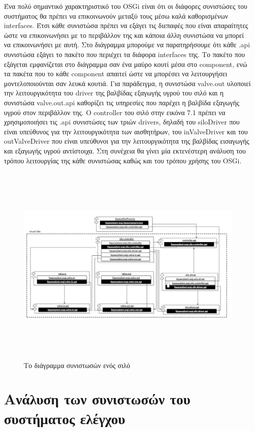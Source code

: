 	Ένα πολύ σημαντικό χαρακτηριστικό του OSGi είναι ότι οι διάφορες συνιστώσες του συστήματος θα πρέπει να επικοινωνούν μεταξύ τους μέσω καλά καθορισμένων interfaces. Έτσι κάθε συνιστώσα πρέπει να εξάγει τις διεπαφές που είναι απαραίτητες ώστε να επικοινωνήσει με το περιβάλλον της και κάποια άλλη συνιστώσα να μπορεί να επικοινωνήσει με αυτή. Στο διάγραμμα μπορούμε να παρατηρήσουμε ότι κάθε .api συνιστώσα εξάγει το πακέτο που περιέχει τα διάφορα interfaces της. Το πακέτο που εξάγεται εμφανίζεται στο διάγραμμα σαν ένα μαύρο κουτί μέσα στο component, ενώ τα πακέτα που το  κάθε component απαιτεί ώστε να μπορέσει να λειτουργήσει μοντελοποιούνται σαν λευκά κουτιά. Για παράδειγμα, η συνιστώσα valve.out υλοποιεί την λειτουργικότητα του driver της βαλβίδας εξαγωγής υγρού του σιλό και η συνιστώσα valve.out.api καθορίζει τις υπηρεσίες που παρέχει η βαλβίδα εξαγωγής υγρού στον περιβάλλον της. Ο controller του σιλό στην εικόνα 7.1 πρέπει να χρησιμοποιήσει τις .api συνιστώσες των τριών drivers, δηλαδή του siloDriver που είναι υπεύθυνος για την λειτουργικότητα των αισθητήρων,  του inValveDriver  και του outValveDriver που είναι υπεύθυνοι για την λειτουργικότητα της βαλβίδας εισαγωγής και εξαγωγής υγρού αντίστοιχα. Στη συνέχεια θα γίνει μία εκτενέστερη ανάλυση του τρόπου λειτουργίας της κάθε συνιστώσας καθώς και του τρόπου χρήσης του OSGi.
	
\begin{figure}[htbp]
	\centering
		\includegraphics[height=10cm,width=16cm]{Figures/21.png}
	\caption{Το διάγραμμα συνιστωσών ενός σιλό}	
\end{figure}

\section{Ανάλυση των συνιστωσών του συστήματος ελέγχου}

